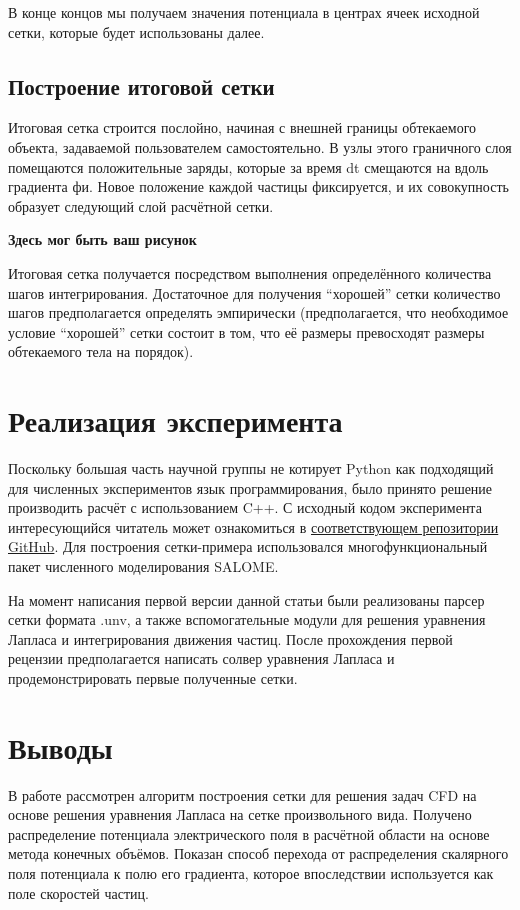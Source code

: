 \documentclass[a4paper,12pt]{article}
\begin{document}
В конце концов мы получаем значения потенциала в центрах ячеек исходной сетки, которые будет использованы далее.

\subsection{Построение итоговой сетки}

Итоговая сетка строится послойно, начиная с внешней границы обтекаемого объекта, задаваемой пользователем самостоятельно. В узлы этого граничного слоя помещаются положительные заряды, которые за время dt смещаются на вдоль градиента фи. Новое положение каждой частицы фиксируется, и их совокупность образует следующий слой расчётной сетки.

\textbf{Здесь мог быть ваш рисунок}

Итоговая сетка получается посредством выполнения определённого количества шагов интегрирования. Достаточное для получения “хорошей” сетки количество шагов предполагается определять эмпирически (предполагается, что необходимое условие “хорошей” сетки состоит в том, что её размеры превосходят размеры обтекаемого тела на порядок).

\section{Реализация эксперимента}

Поскольку большая часть научной группы не котирует Python как подходящий для численных экспериментов язык программирования, было принято решение производить расчёт с использованием C++. С исходный кодом эксперимента интересующийся читатель может ознакомиться в \href{https://github.com/d-qql/FlowMeshBuilder}{соответствующем репозитории GitHub}. Для построения сетки-примера использовался многофункциональный пакет численного моделирования SALOME.

На момент написания первой версии данной статьи были реализованы парсер сетки формата .unv, а также вспомогательные модули для решения уравнения Лапласа и интегрирования движения частиц. После прохождения первой рецензии предполагается написать солвер уравнения Лапласа и продемонстрировать первые полученные сетки.

\section{Выводы}

В работе рассмотрен алгоритм построения сетки для решения задач CFD на основе  решения уравнения Лапласа на сетке произвольного вида. Получено распределение потенциала электрического поля в расчётной области на основе метода конечных объёмов. Показан способ перехода от распределения скалярного поля потенциала к полю его градиента, которое впоследствии используется как поле скоростей частиц.
\end{document}
